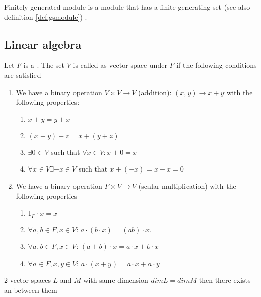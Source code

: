 \begin{appendices}
\begin{definition}
  Finitely generated module is a module that has a finite generating
  set (see also definition \ref{def:gsmodule}) \cite{wiki:fgmodule}.
  \label{def:fgmodule}
\end{definition}

\subsection{Linear algebra}

\begin{definition}
  Let $F$ is a . The set $V$ is called as vector
  space under $F$ if the following conditions are satisfied
  \begin{enumerate}
  \item We have a binary operation $V \times V \rightarrow V$
    (addition): $(x,y) \rightarrow x + y$ with the following
    properties:
    \begin{enumerate}
    \item $x + y = y + x$
    \item $(x + y) + z = x + ( y + z )$
    \item $\exists 0 \in V$ such that $\forall x \in V: x + 0 = x$
    \item $\forall x \in V \exists -x \in V$ such that $x + (-x) = x -
      x = 0$ 
    \end{enumerate}    
  \item We have a binary operation $F \times V \rightarrow V$ (scalar
    multiplication) with the following properties
    \begin{enumerate}
    \item $1_F \cdot x = x$
    \item $\forall a,b \in F, x \in V$: $a\cdot\left(b \cdot x\right)
      = \left(a b\right) \cdot x$.
    \item $\forall a,b \in F, x \in V$:
      $(a+b)\cdot x = a \cdot x + b \cdot x$
    \item $\forall a \in F, x, y \in V$:
      $a\cdot(x+y) = a\cdot x + a \cdot y$
    \end{enumerate}        
  \end{enumerate}
  \label{def:vectorspace}
\end{definition}

\begin{lemma}
  2 vector spaces $L$ and $M$ with same dimension $dim L = dim M$ then
  there exists an  between them
  \label{lem:vsisomorphism}
\end{lemma}


\end{appendices}
